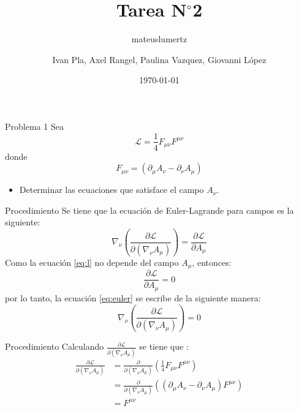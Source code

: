 \documentclass[aspectratio=169]{beamer}
\author{mateuslumertz}
\title[]{Tarea N$^{\circ}$2}
\author{Ivan Pla, Axel Rangel, Paulina Vazquez, Giovanni López}
\date{\today}
\begin{document}
\begin{frame}[plain]
\maketitle
\end{frame}
\begin{frame}{Problema 1}
  Sea \begin{equation}
    \mathcal{L}=  \frac{1}{4}F_{\mu \nu} F^{\mu \nu} 
    \label{eq:l}
  \end{equation}
  donde
  \begin{equation}
    F_{\mu \nu}=\left(\partial_\mu A_\nu - \partial_\nu A_\mu\right)
    \label{eq:ten}
  \end{equation}
  \begin{itemize}
    \item Determinar las ecuaciones que satisface el campo $A_\nu$.
  \end{itemize}
\end{frame}
\begin{frame}{Procedimiento}
  Se tiene que la ecuación de Euler-Lagrande para campos es la siguiente:
\begin{equation}
  \nabla_\nu \left( \frac{\partial \mathcal{L}}{\partial (\nabla_\nu A_\mu)}\right) = \frac{\partial \mathcal{L}}{\partial A_\mu}
  \label{eq:euler}
\end{equation}
Como la ecuación \ref{eq:l} no depende del campo $A_\mu$, entonces:
\begin{equation*}
  \frac{\partial \mathcal{L}}{\partial A_\mu} = 0
\end{equation*}
por lo tanto, la ecuación \ref{eq:euler} se escribe de la siguiente manera:
\begin{equation}
  \nabla_\nu \left( \frac{\partial \mathcal{L}}{\partial (\nabla_\nu A_\mu)}\right) = 0
  \label{eq:euler2}
\end{equation}
\end{frame}
\begin{frame}{Procedimiento}
  Calculando $ \frac{\partial \mathcal{L}}{\partial (\nabla_\nu A_\mu)}$ se tiene que :
  \begin{align*}
    \frac{\partial \mathcal{L}}{\partial (\nabla_\nu A_\mu)} &=   \frac{\partial }{\partial (\nabla_\nu A_\mu)} \left(\frac{1}{4}F_{\mu \nu} F^{\mu \nu} \right)\\
    &= \frac{\partial }{\partial (\nabla_\nu A_\mu)}(\left(\partial_\mu A_\nu - \partial_\nu A_\mu\right) F^{\mu \nu})\\
    & = F^{\mu \nu }
  \end{align*}
\end{frame}
\end{document}
